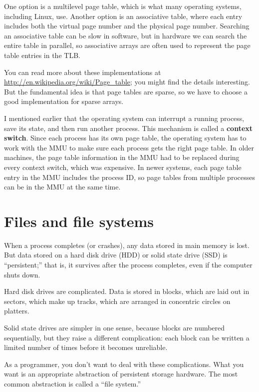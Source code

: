 \documentclass[12pt]{book}
\begin{document}
{One option is a multilevel page table, which is what many operating
systems, including Linux, use.  Another option is an associative table, where each entry includes both the virtual page number and the physical page number.  Searching an associative table can be slow in software, but in hardware we
can search the entire table in parallel, so associative arrays are
often used to represent the page table entries in the TLB.

You can read more about these implementations at
\url{http://en.wikipedia.org/wiki/Page_table}; you might find the
details interesting.  But the fundamental idea is that page tables are
sparse, so we have to choose a good implementation for sparse arrays.

I mentioned earlier that the operating system can interrupt a running
process, save its state, and then run another process.  This mechanism
is called a {\bf context switch}.  Since each process has its own
page table, the operating system has to work with the MMU to make
sure each process gets the right page table.  In older machines,
the page table information in the MMU had to be replaced during every
context switch, which was expensive.  In newer systems, each page
table entry in the MMU includes the process ID, so page tables from
multiple processes can be in the MMU at the same time.



\chapter{Files and file systems}

When a process completes (or crashes), any data stored in main
memory is lost.  But data stored on a hard disk drive (HDD) or
solid state drive (SSD) is ``persistent;'' that is, it survives
after the process completes, even if the computer shuts down.

Hard disk drives are complicated.  Data is stored in blocks, which
are laid out in sectors, which make up tracks, which are arranged
in concentric circles on platters.

Solid state drives are simpler in one sense, because blocks are
numbered sequentially, but they raise a different complication: each
block can be written a limited number of times before it becomes
unreliable.

As a programmer, you don't want to deal with these complications.
What you want is an appropriate abstraction of persistent storage
hardware.  The most common abstraction is called a ``file system.''

}
\end{document}

